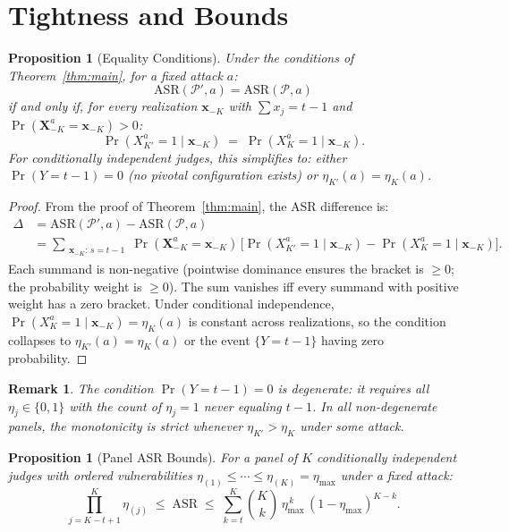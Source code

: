 \documentclass[11pt]{article}
\newtheorem{proposition}[theorem]{Proposition}
\newtheorem*{remark}{Remark}
\begin{document}
\section{Tightness and Bounds}

\begin{proposition}[Equality Conditions]\label{prop:tight}
Under the conditions of Theorem~\ref{thm:main}, for a fixed attack $a$:
\[
    \mathrm{ASR}(\mathcal{P}', a) = \mathrm{ASR}(\mathcal{P}, a)
\]
if and only if, for every realization $\mathbf{x}_{-K}$ with $\sum x_j = t{-}1$ and $\Pr(\mathbf{X}_{-K}^a = \mathbf{x}_{-K}) > 0$:
\[
    \Pr(X_{K'}^a = 1 \mid \mathbf{x}_{-K}) \;=\; \Pr(X_K^a = 1 \mid \mathbf{x}_{-K}).
\]
For conditionally independent judges, this simplifies to: either $\Pr(Y = t{-}1) = 0$ (no pivotal configuration exists) or $\eta_{K'}(a) = \eta_K(a)$.
\end{proposition}

\begin{proof}
From the proof of Theorem~\ref{thm:main}, the ASR difference is:
\begin{align*}
    \Delta
    &= \mathrm{ASR}(\mathcal{P}', a) - \mathrm{ASR}(\mathcal{P}, a) \\
    &= \!\!\sum_{\substack{\mathbf{x}_{-K}:\, s = t-1}}\!\! \Pr(\mathbf{X}_{-K}^a {=} \mathbf{x}_{-K})\,\bigl[\Pr(X_{K'}^a {=} 1 \mid \mathbf{x}_{-K}) - \Pr(X_K^a {=} 1 \mid \mathbf{x}_{-K})\bigr].
\end{align*}
Each summand is non-negative (pointwise dominance ensures the bracket is $\geq 0$; the probability weight is $\geq 0$). The sum vanishes iff every summand with positive weight has a zero bracket. Under conditional independence, $\Pr(X_K^a = 1 \mid \mathbf{x}_{-K}) = \eta_K(a)$ is constant across realizations, so the condition collapses to $\eta_{K'}(a) = \eta_K(a)$ or the event $\{Y = t{-}1\}$ having zero probability.
\end{proof}

\begin{remark}
The condition $\Pr(Y = t{-}1) = 0$ is degenerate: it requires all $\eta_j \in \{0,1\}$ with the count of $\eta_j = 1$ never equaling $t{-}1$. In all non-degenerate panels, the monotonicity is \emph{strict} whenever $\eta_{K'} > \eta_K$ under some attack.
\end{remark}

\begin{proposition}[Panel ASR Bounds]\label{prop:bounds}
For a panel of $K$ conditionally independent judges with ordered vulnerabilities $\eta_{(1)} \leq \cdots \leq \eta_{(K)} = \eta_{\max}$ under a fixed attack:
\[
    \prod_{j=K-t+1}^{K} \eta_{(j)} \;\leq\; \mathrm{ASR} \;\leq\; \sum_{k=t}^{K} \binom{K}{k}\, \eta_{\max}^{\,k}\, (1-\eta_{\max})^{K-k}.
\]
\end{proposition}
\end{document}
